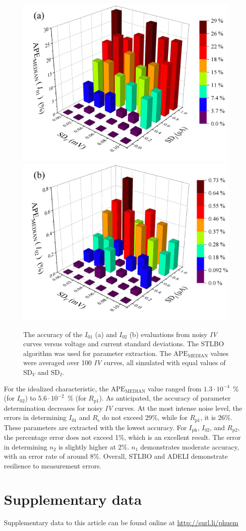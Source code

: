 \documentclass[a4paper,fleqn]{cas-sc}
\begin{document}
\begin{figure}[]
	\centering
		\includegraphics[width=0.40\columnwidth]{I01}
		\includegraphics[width=0.45\columnwidth]{FigA-I02}
	  \caption{The accuracy of the $I_{01}$ (a) and $I_{02}$ (b) evaluations from noisy \emph{IV} curves versus voltage and current standard deviations. 
               The STLBO algorithm was used for parameter extraction. 
               The $\mathrm{APE}_\mathrm{MEDIAN}$ values were averaged over 100 \emph{IV} curves, all simulated with equal values of $\mathrm{SD}_V$ and $\mathrm{SD}_I$.
}\label{figNoisy}
\end{figure}

For the idealized characteristic, the $\mathrm{APE}_\mathrm{MEDIAN}$ 
value ranged from $1.3\cdot10^{-4}$~\% (for $I_{02}$) to $5.6\cdot10^{-2}$~\% (for $R_\mathrm{p1}$).
As anticipated, the accuracy of parameter determination decreases for noisy \emph{IV} curves. 
At the most intense noise level, the errors in determining $I_{01}$ and $R_\mathrm{s}$ do not exceed 29\%, 
while for $R_\mathrm{p1}$, it is 26\%.
These parameters are extracted with the lowest accuracy. 
For $I_\mathrm{ph}$, $I_{02}$, and $R_\mathrm{p2}$, 
the percentage error does not exceed 1\%, which is an excellent result. 
The error in determining $n_2$ is slightly higher at 2\%.
$n_1$ demonstrates moderate accuracy, with an error rate of around 8\%.
Overall, STLBO and ADELI demonstrate resilience to measurement errors.



\section{Supplementary data}\label{SuplData}
Supplementary data to this article can be found online at
\url{http://surl.li/phuem}




\end{document}
